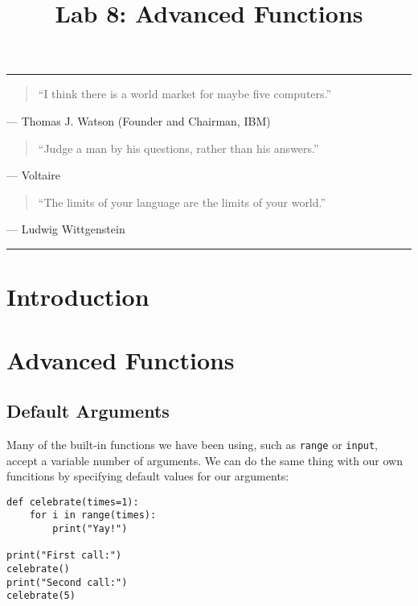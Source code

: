 \documentclass[11pt]{cselabheader}
\title{Lab 8: Advanced Functions}
\begin{document}
\maketitle

\hrule
\begin{quotation}
``I think there is a world market for maybe five computers.''
\end{quotation}
\begin{flushright}
--- Thomas J. Watson (Founder and Chairman, IBM)
\end{flushright}

\begin{quotation}
``Judge a man by his questions, rather than his answers.''
\end{quotation}
\begin{flushright}
--- Voltaire
\end{flushright}

\begin{quotation}
``The limits of your language are the limits of your world.''
\end{quotation}
\begin{flushright}
--- Ludwig Wittgenstein
\end{flushright}

\hrule

\section{Introduction}


\pagebreak
\section{Advanced Functions}
\label{sec:advfun}

\subsection{Default Arguments}
\label{subsec:arg}
Many of the built-in functions we have been using, such as \lstinline{range} or \lstinline{input}, accept a variable number of arguments. We can do the same thing with our own funcitions by specifying default values for our arguments:

\begin{lstlisting}[style=python]
def celebrate(times=1):
    for i in range(times):
        print("Yay!")

print("First call:")
celebrate()
print("Second call:")
celebrate(5)
\end{lstlisting}
\end{document}
